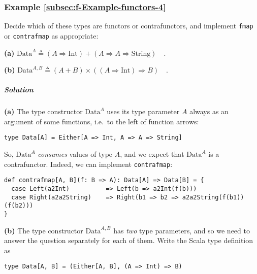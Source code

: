\subsubsection{Example \label{subsec:f-Example-functors-4}\ref{subsec:f-Example-functors-4}}

Decide which of these types are functors or contrafunctors, and implement
\lstinline!fmap! or \lstinline!contrafmap! as appropriate:

\textbf{(a)} $\text{Data}^{A}\triangleq\left(A\Rightarrow\text{Int}\right)+(A\Rightarrow A\Rightarrow\text{String})\quad.$ 

\textbf{(b)} $\text{Data}^{A,B}\triangleq\left(A+B\right)\times\left(\left(A\Rightarrow\text{Int}\right)\Rightarrow B\right)\quad.$

\subparagraph{Solution}

\textbf{(a)} The type constructor $\text{Data}^{A}$ uses its type
parameter $A$ always as an argument of some functions, i.e.~to the
left of function arrows:
\begin{lstlisting}
type Data[A] = Either[A => Int, A => A => String]
\end{lstlisting}
So, $\text{Data}^{A}$ \emph{consumes} values of type $A$, and we
expect that $\text{Data}^{A}$ is a contrafunctor. Indeed, we can
implement \lstinline!contrafmap!:
\begin{lstlisting}
def contrafmap[A, B](f: B => A): Data[A] => Data[B] = {
  case Left(a2Int)          => Left(b => a2Int(f(b)))
  case Right(a2a2String)    => Right(b1 => b2 => a2a2String(f(b1))(f(b2)))
}
\end{lstlisting}

\textbf{(b)} The type constructor $\text{Data}^{A,B}$ has \emph{two}
type parameters, and so we need to answer the question separately
for each of them. Write the Scala type definition as
\begin{lstlisting}
type Data[A, B] = (Either[A, B], (A => Int) => B)
\end{lstlisting}

